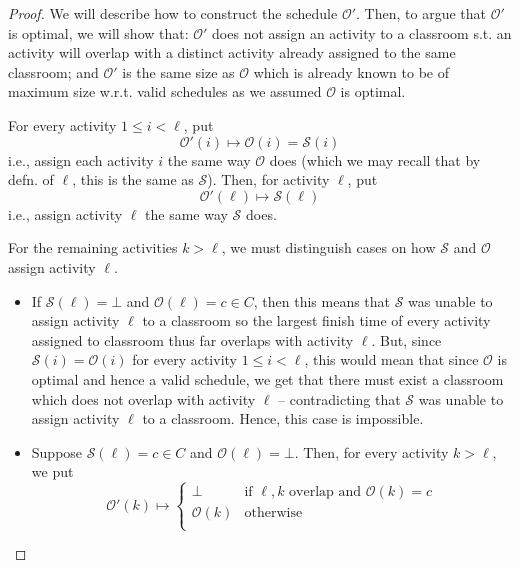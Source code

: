 \documentclass{article}
\theoremstyle{plain}%
\theoremstyle{definition}
\theoremstyle{remark}
\begin{document}
\begin{proof}
    We will describe how to construct the schedule $\mathcal{O}'$.
    Then, to argue that $\mathcal{O}'$ is optimal,
        we will show that: $\mathcal{O}'$ does not assign an activity to a
            classroom s.t. an activity will overlap with a distinct activity
            already assigned to the same classroom; 
            and $\mathcal{O}'$ is the same size as $\mathcal{O}$ which is
            already known to be of maximum size w.r.t. valid schedules as we
            assumed $\mathcal{O}$ is optimal.

    For every activity $1 \le i < \ell$, 
        put 
        \begin{equation}
            \mathcal{O}'(i) \mapsto \mathcal{O}(i) = \mathcal{S}(i) 
        \end{equation}
        i.e., assign each activity $i$ the same way $\mathcal{O}$ does (which
        we may recall that by defn. of $\ell$, this is the same as $\mathcal{S}$).
    Then, for activity $\ell$, put 
        \begin{equation}
            \mathcal{O}'(\ell) \mapsto \mathcal{S}(\ell)
        \end{equation}
        i.e., assign activity $\ell$ the same way $\mathcal{S}$ does.

    For the remaining activities $k > \ell$, we must distinguish cases on how $\mathcal{S}$
        and $\mathcal{O}$ assign activity $\ell$.
    \begin{itemize}
        \item If $\mathcal{S}(\ell) = \bot$ and $\mathcal{O}(\ell) = c \in C$,
                then this means that $\mathcal{S}$ was unable to assign activity $\ell$ to a
                classroom so the largest finish time of every activity assigned
                to classroom thus far overlaps with activity $\ell$.
                But, since $\mathcal{S}(i) = \mathcal{O}(i)$ for every activity $1 \le i < \ell$,
                    this would mean that since $\mathcal{O}$ is optimal and hence a valid schedule,
                    we get that there must exist a classroom which does not overlap with activity $\ell$
                    -- contradicting that $\mathcal{S}$ was unable to assign activity $\ell$ to a classroom.
                Hence, this case is impossible.

        \item Suppose $\mathcal{S}(\ell) = c \in C$ and $\mathcal{O}(\ell) = \bot$.
            Then, for every activity $k > \ell$, we put
            \begin{equation}
                \mathcal{O}'(k) \mapsto
                    \begin{cases}
                        \bot & \text{if $\ell, k$ overlap and $\mathcal{O}(k) = c$} \\
                        \mathcal{O}(k) & \text{otherwise} \\
                    \end{cases}
            \end{equation}


\end{itemize}
\end{proof}
\end{document}
